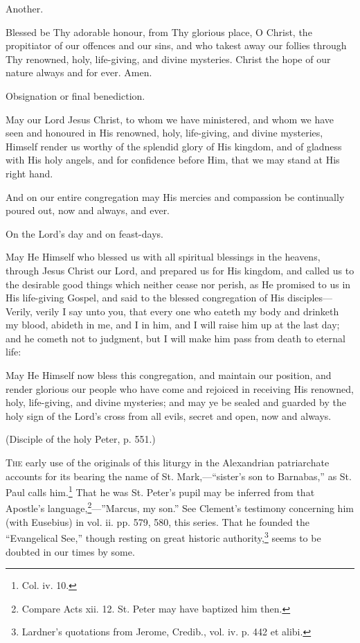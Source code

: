 Another.

Blessed be Thy adorable honour, from Thy glorious place, O Christ, the propitiator of our offences and our sins, and who takest away our follies through Thy renowned, holy, life-giving, and divine mysteries. Christ the hope of our nature always and for ever. Amen.

Obsignation or final benediction.

May our Lord Jesus Christ, to whom we have ministered, and whom we have seen and honoured in His renowned, holy, life-giving, and divine mysteries, Himself render us worthy of the splendid glory of His kingdom, and of gladness with His holy angels, and for confidence before Him, that we may stand at His right hand.

And on our entire congregation may His mercies and compassion be continually poured out, now and always, and ever.

On the Lord’s day and on feast-days.

May He Himself who blessed us with all spiritual blessings in the heavens, through Jesus Christ our Lord, and prepared us for His kingdom, and called us to the desirable good things which neither cease nor perish, as He promised to us in His life-giving Gospel, and said to the blessed congregation of His disciples—Verily, verily I say unto you, that every one who eateth my body and drinketh my blood, abideth in me, and I in him, and I will raise him up at the last day; and he cometh not to judgment, but I will make him pass from death to eternal life:

May He Himself now bless this congregation, and maintain our position, and render glorious our people who have come and rejoiced in receiving His renowned, holy, life-giving, and divine mysteries; and may ye be sealed and guarded by the holy sign of the Lord’s cross from all evils, secret and open, now and always.


(Disciple of the holy Peter, p. 551.)

\textsc{The} early use of the originals of this liturgy in the Alexandrian patriarchate accounts for its bearing the name of St. Mark,—“sister’s son to Barnabas,” as St. Paul calls him.\footnote{\par  Col. iv. 10.} That he was St. Peter’s pupil may be inferred from that Apostle’s language,\footnote{\par  Compare Acts xii. 12. St. Peter may have baptized him then.}—”Marcus, my son.” See Clement’s testimony concerning him (with Eusebius) in vol. ii. pp. 579, 580, this series. That he founded the “Evangelical See,” though resting on great historic authority,\footnote{\par  Lardner’s quotations from Jerome, Credib., vol. iv. p. 442 et alibi.} seems to be doubted in our times by some.

